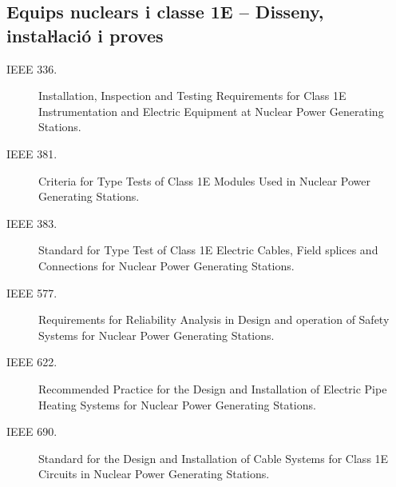 \subsection*{Equips nuclears i classe 1E -- Disseny, instaŀlació i proves}
\begin{description}
    \item [\hspace{5mm}IEEE 336.] Installation, Inspection and Testing Requirements for Class 1E Instrumentation and Electric Equipment at Nuclear Power Generating Stations.
     \item [\hspace{5mm}IEEE 381.] Criteria for Type Tests of Class 1E Modules Used in Nuclear Power Generating Stations.
    \item [\hspace{5mm}IEEE 383.] Standard for Type Test of Class 1E Electric Cables, Field splices and Connections for Nuclear Power Generating Stations.
    \item [\hspace{5mm}IEEE 577.] Requirements for Reliability Analysis in Design and operation of Safety Systems for Nuclear Power Generating Stations.
    \item [\hspace{5mm}IEEE 622.] Recommended Practice for the Design and Installation of Electric Pipe Heating Systems for Nuclear Power Generating Stations.
    \item [\hspace{5mm}IEEE 690.] Standard for the Design and Installation of Cable Systems for Class 1E Circuits in Nuclear Power Generating Stations.
\end{description}



